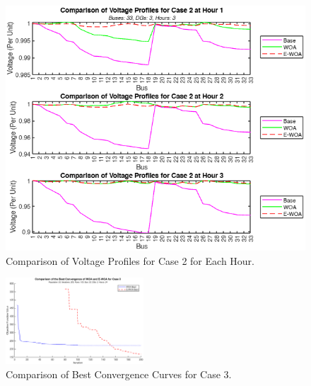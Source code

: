 \documentclass[conference]{IEEEtran}
\begin{document}
\begin{figure}[htbp]
	\centerline{\includegraphics[width=0.9\columnwidth]{voltageprofile.png}}
	\vspace{-5pt}
	\caption{Comparison of Voltage Profiles for Case 2 for Each Hour.}
	\label{fig:voltageprofile}
\end{figure}



\begin{figure}[htbp]
	\centerline{\includegraphics[width=0.46\textwidth]{convergencecurve.png}}
	\vspace{-5pt}
	\caption{Comparison of Best Convergence Curves for Case 3.}
	\vspace{-10pt}
	\label{fig:convergencecurve}
\end{figure}




%
\end{document}
